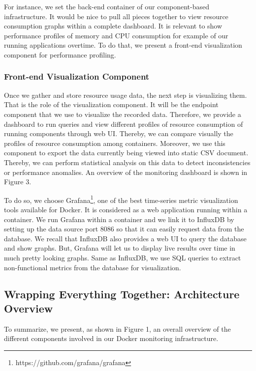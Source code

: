For instance, we set the back-end container of our component-based infrastructure. It would be nice to pull all pieces together to view resource consumption graphs within a complete dashboard. It is relevant to show performance profiles of memory and CPU consumption for example of our running applications overtime. To do that, we present a front-end visualization component for performance profiling. 

\subsubsection{Front-end Visualization Component}
Once we gather and store resource usage data, the next step is visualizing them. That is the role of the visualization component. It will be the endpoint component that we use to visualize the recorded data. Therefore, we provide a dashboard to run queries and view different profiles of resource consumption of running components through web UI. Thereby, we can compare visually the profiles of resource consumption among containers. Moreover, we use this component to export the data currently being viewed into static CSV document. Thereby, we can perform statistical analysis on this data to detect inconsistencies or performance anomalies. An overview of the monitoring dashboard is shown in Figure 3.

To do so, we choose Grafana\footnote{https://github.com/grafana/grafana}, one of the best time-series metric visualization tools available for Docker. It is considered as a web application running within a container. We run Grafana within a container and we link it to InfluxDB by setting up the data source port 8086 so that it can easily request data from the database. 
We recall that InfluxDB also provides a web UI to query the database and show graphs. But, Grafana will let us to display live results over time in much pretty looking graphs. Same as InfluxDB, we use SQL queries to extract non-functional metrics from the database for visualization.

\subsection{Wrapping Everything Together: Architecture Overview}
To summarize, we present, as shown in Figure 1, an overall overview of the different components involved in our Docker monitoring infrastructure.

